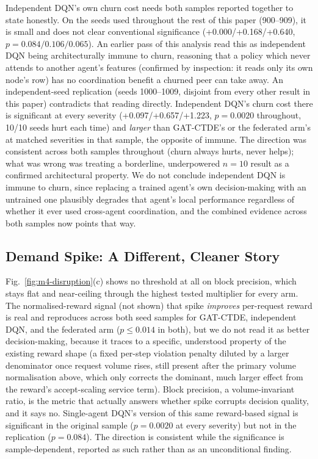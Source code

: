 \documentclass[journal]{IEEEtran}
\begin{document}
Independent DQN's own churn cost needs both samples reported together
to state honestly. On the seeds used throughout the rest of this paper
(900--909), it is small and does not clear conventional significance
(+0.000/+0.168/+0.640, $p=0.084/0.106/0.065$). An earlier pass
of this analysis read this as independent DQN being architecturally immune
to churn, reasoning that a policy which never attends to another
agent's features (confirmed by inspection: it reads only its own node's
row) has no coordination benefit a churned peer can take away. An
independent-seed replication (seeds 1000--1009, disjoint from every
other result in this paper) contradicts that reading directly.
Independent DQN's churn cost there is significant at every severity
(+0.097/+0.657/+1.223, $p=0.0020$ throughout, 10/10 seeds hurt each
time) and \emph{larger} than GAT-CTDE's or the federated arm's at
matched severities in that sample, the opposite of immune. The
direction was consistent across both samples throughout (churn always
hurts, never helps); what was wrong was treating a borderline,
underpowered $n=10$ result as a confirmed architectural property. We do
not conclude independent DQN is immune to churn, since replacing a trained
agent's own decision-making with an untrained one plausibly degrades
that agent's local performance regardless of whether it ever used
cross-agent coordination, and the combined evidence across both samples
now points that way.

\subsection{Demand Spike: A Different, Cleaner Story}
Fig.~\ref{fig:m4-disruption}(c) shows no threshold at all on block
precision, which stays flat and near-ceiling through the highest tested
multiplier for every arm. The normalised-reward signal (not shown) that
spike \emph{improves} per-request reward is real and reproduces across
both seed samples for GAT-CTDE, independent DQN, and the federated arm
($p\leq0.014$ in both), but we do not read it as better decision-making,
because it traces to a specific, understood property of the existing reward
shape (a fixed per-step violation penalty diluted by a larger
denominator once request volume rises, still present after the primary
volume normalisation above, which only corrects the dominant,
much larger effect from the reward's accept-scaling service term).
Block precision, a volume-invariant ratio, is the metric that actually
answers whether spike corrupts decision quality, and it says no.
Single-agent DQN's version of this same reward-based signal is
significant in the original sample ($p=0.0020$ at every severity) but
not in the replication ($p=0.084$). The direction is consistent while the
significance is sample-dependent, reported as such rather than as an
unconditional finding.
\end{document}
